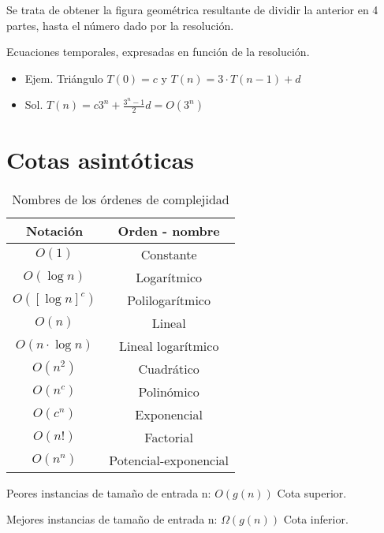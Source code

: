 Se trata de obtener la figura geométrica resultante de dividir la anterior en 4 partes, hasta el número dado por la resolución.

Ecuaciones temporales, expresadas en función de la resolución.
\begin{itemize}
  \item Ejem. Triángulo $T\left(0\right)=c$ y $T\left(n\right)=3\cdot T\left(n-1\right)+d$
  \item Sol. $T\left(n\right)= c3^n+ \frac{3^n-1}{2}d=O\left(3^n\right)$
\end{itemize}

\section{Cotas asintóticas}
\begin{table}[H]
  \begin{tabular}{|c|c|}
  \hline
  \rowcolor[HTML]{BFBFBF} 
  Notación                            & Orden - nombre                               \\ \hline
  $O\left(1\right)$                                & Constante                                    \\ \hline
  $O\left(\log n\right)$                            & Logarítmico                                  \\ \hline
  $O\left([\log n]^c\right)$                        & Polilogarítmico                              \\ \hline
  $O\left(n\right)$         & Lineal                \\ \hline
  $O\left(n \cdot \log n\right)$ & Lineal logarítmico    \\ \hline
  $O(n^2)$       & Cuadrático            \\ \hline
  $O\left(n^c\right)$       & Polinómico            \\ \hline
  $O\left(c^n\right)$       & Exponencial           \\ \hline
  $O\left(n!\right)$        & Factorial             \\ \hline
  $O\left(n^n\right)$       & Potencial-exponencial \\ \hline
  \end{tabular}
  \caption{Nombres de los órdenes de complejidad}
\end{table}

Peores instancias de tamaño de entrada n: $O\left(g\left(n\right)\right)$ Cota superior.

Mejores instancias de tamaño de entrada n: $\Omega\left(g\left(n\right)\right)$ Cota inferior.

